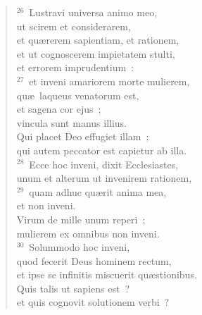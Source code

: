 \begin{flushleft}\begin{verse}${}^{26}$~Lustravi universa animo meo,\\ ut scirem et considerarem,\\ et qu\ae rerem sapientiam, et rationem,\\ et ut cognoscerem impietatem stulti,\\ et errorem imprudentium~:\\
${}^{27}$~et inveni amariorem morte mulierem,\\ qu\ae\ laqueus venatorum est,\\ et sagena cor ejus~;\\ vincula sunt manus illius.\\ Qui placet Deo effugiet illam~;\\ qui autem peccator est capietur ab illa.\\
${}^{28}$~Ecce hoc inveni, dixit Ecclesiastes,\\ unum et alterum ut invenirem rationem,\\
${}^{29}$~quam adhuc qu\ae rit anima mea,\\ et non inveni.\\ Virum de mille unum reperi~;\\ mulierem ex omnibus non inveni.\\
${}^{30}$~Solummodo hoc inveni,\\ quod fecerit Deus hominem rectum,\\ et ipse se infinitis miscuerit qu\ae stionibus.\\ Quis talis ut sapiens est~?\\ et quis cognovit solutionem verbi~?\end{verse}\end{flushleft}


